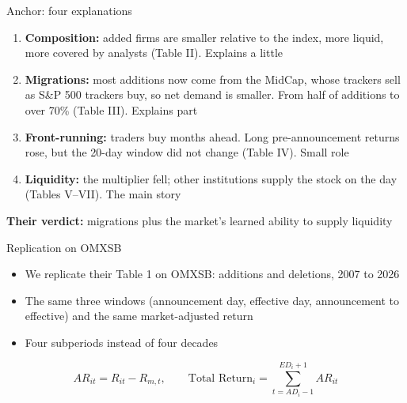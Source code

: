 \documentclass[aspectratio=169]{beamer}
\begin{document}
\begin{frame}[label=anchor-explanations]{Anchor: four explanations}
  \begin{enumerate}
    \item \textbf{Composition:} added firms are smaller relative to the index, more
      liquid, more covered by analysts (Table II). Explains a little
    \item \textbf{Migrations:} most additions now come from the MidCap, whose trackers
      sell as S\&P 500 trackers buy, so net demand is smaller. From half of additions
      to over 70\% (Table III). Explains part
    \item \textbf{Front-running:} traders buy months ahead. Long pre-announcement
      returns rose, but the 20-day window did not change (Table IV). Small role
    \item \textbf{Liquidity:} the multiplier fell; other institutions supply the
      stock on the day (Tables V--VII). The main story
  \end{enumerate}
  \bigskip
  \textbf{Their verdict:} migrations plus the market's learned ability to supply liquidity
\end{frame}

\begin{frame}[label=replication]{Replication on OMXSB}
  \begin{itemize}
    \item We replicate their Table 1 on OMXSB: additions and deletions,
      2007 to 2026
    \item The same three windows (announcement day, effective day, announcement to
      effective) and the same market-adjusted return
    \item Four subperiods instead of four decades
  \end{itemize}
  \[
    AR_{it} = R_{it} - R_{m,t}, \qquad
    \text{Total Return}_i = \sum_{t=AD_i-1}^{ED_i+1} AR_{it}
  \]
\end{frame}
\end{document}

